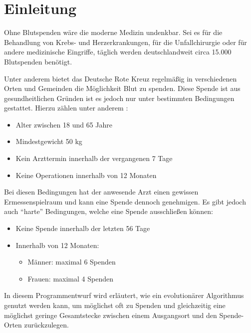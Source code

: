 \section{Einleitung}\label{sec:einleitung}
Ohne Blutspenden wäre die moderne Medizin undenkbar.
Sei es für die Behandlung von Krebs- und Herzerkrankungen,
für die Unfallchirurgie oder für andere medizinische Eingriffe,
täglich werden deutschlandweit circa 15.000 Blutspenden benötigt. \cite{FragenAn98:online}

Unter anderem bietet das Deutsche Rote Kreuz regelmäßig in verschiedenen Orten und Gemeinden die Möglichkeit Blut zu spenden.
Diese Spende ist aus gesundheitlichen Gründen ist es jedoch nur unter bestimmten Bedingungen gestattet.
Hierzu zählen unter anderem \cite{SpendeCh65:online}:
\begin{itemize}
    \setlength\itemsep{-0.5em}
    \item Alter zwischen 18 und 65 Jahre
    \item Mindestgewicht 50 kg
    \item Kein Arzttermin innerhalb der vergangenen 7 Tage
    \item Keine Operationen innerhalb von 12 Monaten
\end{itemize}

Bei diesen Bedingungen hat der anwesende Arzt einen gewissen Ermessenspielraum und kann eine Spende dennoch genehmigen.
Es gibt jedoch auch \enquote{harte} Bedingungen, welche eine Spende ausschließen können:

\begin{itemize}
    \setlength\itemsep{-0.5em}
    \item Keine Spende innerhalb der letzten 56 Tage
    \item Innerhalb von 12 Monaten: \begin{itemize}
        \vspace{-1em}
        \setlength\itemsep{-0.5em}
        \item Männer:  maximal 6 Spenden
        \item Frauen:  maximal 4 Spenden
    \end{itemize}
\end{itemize}

In diesem Programmentwurf wird erläutert,
wie ein evolutionärer Algorithmus genutzt werden kann,
um möglichst oft zu Spenden und
gleichzeitig eine möglichst geringe Gesamtstecke zwischen einem Ausgangsort und den Spende-Orten zurückzulegen.
